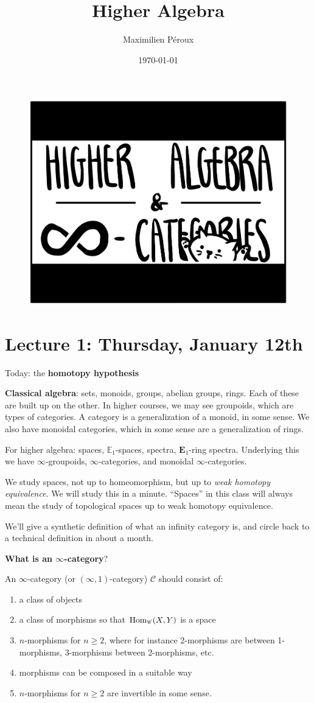 \documentclass[12pt]{amsart}
\title{Higher Algebra}
\author{Maximilien P\'eroux}
\date{\today}
\theoremstyle{definition}
\begin{document}
\maketitle

\begin{figure}[h]
  \includegraphics[width=0.5\linewidth]{pics/ha.jpg}
  \centering
\end{figure}

\tableofcontents{}

\section{Lecture 1: Thursday, January 12th}

Today: the \textbf{homotopy hypothesis}

\textbf{Classical algebra}: sets, monoids, groups, abelian groups, rings. Each of these are built up on the other. In higher courses, we may see groupoids, which are types of categories. A category is a generalization of a monoid, in some sense. We also have monoidal categories, which in some sense are a generalization of rings.

For higher algebra: spaces, $\mathbb{E}_1$-spaces, spectra, $\mathbf{E}_1$-ring spectra. Underlying this we have $\infty$-groupoids, $\infty$-categories, and monoidal $\infty$-categories.

We study spaces, not up to homeomorphism, but up to \textit{weak homotopy equivalence}. We will study this in a minute. ``Spaces'' in this class will always mean the study of topological spaces up to weak homotopy equivalence.

We'll give a synthetic definition of what an infinity category is, and circle back to a technical definition in about a month.

\textbf{What is an $\infty$-category}?

An $\infty$-category (or $(\infty,1)$-category) $\mathscr{C}$ should consist of:
\begin{enumerate}
    \item a class of objects
    \item a class of morphisms so that $\text{Hom}_\mathscr{C}(X,Y)$ is a space
    \item $n$-morphisms for $n \ge 2$, where for instance 2-morphisms are between 1-morphisms, 3-morphisms between 2-morphisms, etc.
    \item morphisms can be composed in a suitable way
    \item $n$-morphisms for $n\ge 2$ are invertible in some sense.
\end{enumerate}
\end{document}
